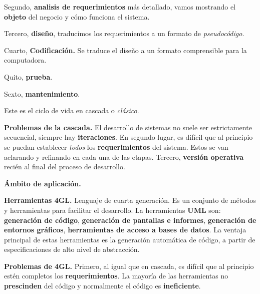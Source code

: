 \documentclass{article}
\begin{document}
Segundo, \textbf{analisis de requerimientos} más detallado, vamos mostrando el
\textbf{objeto} del negocio y cómo funciona el sistema.

Tercero, \textbf{diseño}, traducimos los requerimientos a un formato de
\textit{pseudocódigo}.

Cuarto, \textbf{Codificación.} Se traduce el diseño a un formato comprensible para la
computadora.

Quito, \textbf{prueba}.

Sexto, \textbf{mantenimiento}.

Este es el ciclo de vida en cascada o \textit{clásico}.

\textbf{Problemas de la cascada.} El desarrollo de sistemas no suele ser
estrictamente secuencial, siempre hay \textbf{iteraciones}. En segundo lugar,
es difícil que al principio se puedan establecer \textit{todos} los
\textbf{requerimientos} del sistema. Estos se van aclarando y refinando en cada
una de las etapas. Tercero, \textbf{versión operativa} recién al final del
proceso de desarrollo.

\textbf{Ámbito de aplicación.}

\textbf{Herramientas 4GL.} Lenguaje de cuarta generación. Es un conjunto de
métodos y herramientas para facilitar el desarrollo. La herramientas
\textbf{UML} son: \textbf{generación de código},
\textbf{generación de pantallas e informes},
\textbf{generación de entornos gráficos},
\textbf{herramientas de acceso a bases de datos}.
La ventaja principal de estas herramientas es la generación automática de código,
a partir de especificaciones de alto nivel de abstracción.

\textbf{Problemas de 4GL.} Primero, al igual que en cascada, es difícil que al
principio estén completos los \textbf{requerimientos}. La mayoría de las
herramientas no \textbf{prescinden} del código y normalmente el código es
\textbf{ineficiente}.
\end{document}
